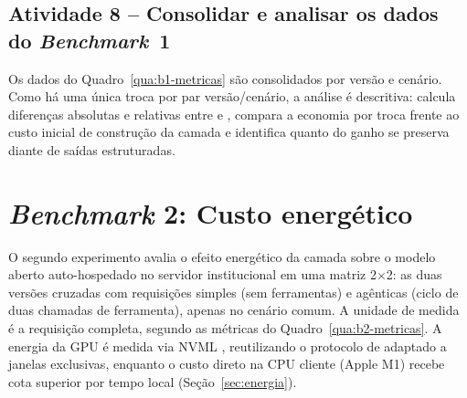 \subsection{Atividade 8 -- Consolidar e analisar os dados do \textit{Benchmark}~1}
\label{subsec:at-analise-b1}

Os dados do Quadro~\ref{qua:b1-metricas} são consolidados por versão e cenário.
Como há uma única troca por par versão/cenário, a análise é descritiva: calcula
diferenças absolutas e relativas entre \versaoH{} e \versaoD{}, compara a
economia por troca frente ao custo inicial de construção da camada e identifica
quanto do ganho se preserva diante de saídas estruturadas.

\section{\textit{Benchmark} 2: Custo energético}
\label{sec:b2}

O segundo experimento avalia o efeito energético da camada sobre o modelo aberto
auto-hospedado no servidor institucional em uma matriz 2$\times$2: as duas
versões cruzadas com requisições simples (sem ferramentas) e agênticas (ciclo
de duas chamadas de ferramenta), apenas no cenário comum. A unidade de medida é
a requisição completa, segundo as métricas do Quadro~\ref{qua:b2-metricas}. A
energia da GPU é medida via NVML \cite{fernandez2025}, reutilizando o protocolo
de  adaptado a janelas exclusivas, enquanto o custo
direto na CPU cliente (Apple M1) recebe cota superior por tempo local
(Seção~\ref{sec:energia}).

